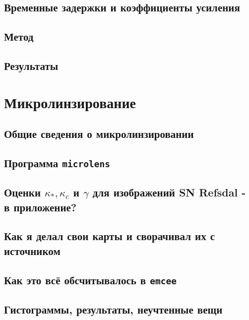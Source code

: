 \documentclass{mipt-thesis-ms}
\numberwithin{equation}{chapter}
\begin{document}
\section{Временные задержки и коэффициенты усиления}

\section{Метод}

\section{Результаты}


\chapter{Микролинзирование}

\section{Общие сведения о микролинзировании}

\section{Программа \texttt{microlens}}

\section{Оценки $\kappa_*, \kappa_c$ и $\gamma$ для изображений SN Refsdal - в приложение?}

\section{Как я делал свои карты и сворачивал их с источником}

\section{Как это всё обсчитывалось в \tt{emcee}}
\section{Гистограммы, результаты, неучтенные вещи}




%
%
%
\end{document}
